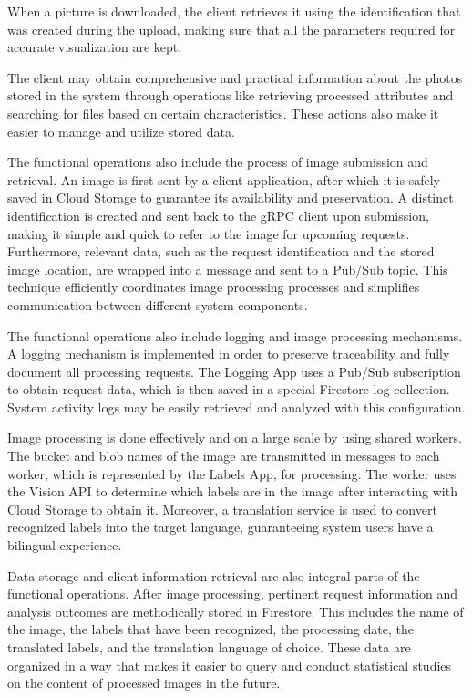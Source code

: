 When a picture is downloaded, the client retrieves it using the identification that was created during the upload, making sure that all the parameters required for accurate visualization are kept.

The client may obtain comprehensive and practical information about the photos stored in the system through operations like retrieving processed attributes and searching for files based on certain characteristics. These actions also make it easier to manage and utilize stored data.

The functional operations also include the process of image submission and retrieval. An image is first sent by a client application, after which it is safely saved in Cloud Storage to guarantee its availability and preservation. A distinct identification is created and sent back to the gRPC client upon submission, making it simple and quick to refer to the image for upcoming requests. Furthermore, relevant data, such as the request identification and the stored image location, are wrapped into a message and sent to a Pub/Sub topic. This technique efficiently coordinates image processing processes and simplifies communication between different system components.

The functional operations also include logging and image processing mechanisms. A logging mechanism is implemented in order to preserve traceability and fully document all processing requests. The Logging App uses a Pub/Sub subscription to obtain request data, which is then saved in a special Firestore log collection. System activity logs may be easily retrieved and analyzed with this configuration.

Image processing is done effectively and on a large scale by using shared workers. The bucket and blob names of the image are transmitted in messages to each worker, which is represented by the Labels App, for processing. The worker uses the Vision API to determine which labels are in the image after interacting with Cloud Storage to obtain it. Moreover, a translation service is used to convert recognized labels into the target language, guaranteeing system users have a bilingual experience.

Data storage and client information retrieval are also integral parts of the functional operations. After image processing, pertinent request information and analysis outcomes are methodically stored in Firestore. This includes the name of the image, the labels that have been recognized, the processing date, the translated labels, and the translation language of choice. These data are organized in a way that makes it easier to query and conduct statistical studies on the content of processed images in the future.


